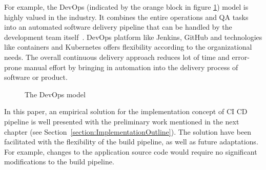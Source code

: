 For example, the DevOps (indicated by the orange block in figure \ref{fig:DevOps model}) model is highly valued in the industry. It combines the entire operations and QA tasks into an automated software delivery pipeline that can be handled by the development team itself~\parencite{leszko2017continuous}. DevOps platform like Jenkins, GitHub and technologies like containers and Kubernetes offers flexibility according to the organizational needs. The overall continuous delivery approach reduces lot of time and error-prone manual effort by bringing in automation into the delivery process of software or product.

\vspace{0.5cm}
\begin{figure}[H]
\caption[DevOps model]{The DevOps model\footnotemark}
\label{fig:DevOps model}
\end{figure}
\vspace{0.5cm}




In this paper, an empirical solution for the implementation concept of \ac{CI} \ac{CD} pipeline is well presented with the preliminary work mentioned in the next chapter (see Section~\ref{section:ImplementationOutline}). The solution have been facilitated with the flexibility of the build pipeline, as well as future adaptations. For example, changes to the application source code would require no significant modifications to the build pipeline. 

